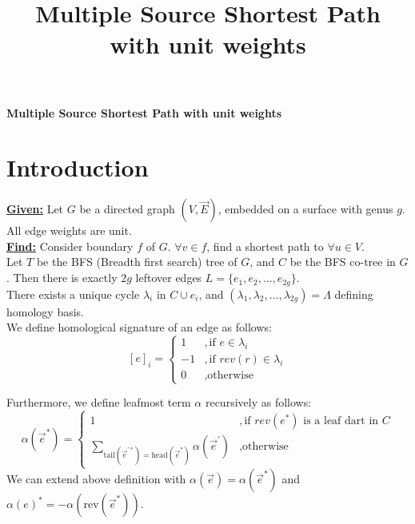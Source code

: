\documentclass{article}
\begin{document}
\title{Multiple Source Shortest Path with unit weights}

\begin{center}
\textbf{\large Multiple Source Shortest Path with unit weights}
\end{center}

\section{Introduction}

\textbf{\underline{Given:}} Let $G$ be a directed graph $(V, \vec{E})$, embedded
on a surface with genus $g$. All edge weights are unit. \\
\textbf{\underline{Find:}} Consider boundary $f$ of $G$. $\forall v \in f$, find
a shortest path to $\forall u \in V$. \\

Let $T$ be the BFS (Breadth first search) tree of $G$, and $C$ be the BFS co-tree
in $G$. Then there is exactly $2g$ leftover edges $L = \{e_1, e_2, \ldots, e_{2g}\}$. \\

There exists a unique cycle $\lambda_i$ in $C \cup {e_i}$, and $(\lambda_1, 
\lambda_2, \ldots, \lambda_{2g}) = \Lambda$ defining homology basis. \\
We define homological signature of an edge as follows:
\[ [e]_{i} = \begin{cases} 1 & ,\mbox{if } e \in \lambda_i \\
                          -1 & ,\mbox{if } rev(r) \in \lambda_i \\
                           0 & ,\mbox{otherwise} \end{cases}\]

Furthermore, we define leafmost term $\alpha$ recursively as follows: \\
\[ \alpha(\vec{e}^*) = \begin{cases} 1 & ,\mbox{if } rev(e^*) \mbox{ is a leaf dart in } C \\
                           \sum \limits_{ \text{tail}(\vec{e}^{'*})
                           = \text{head}(\vec{e}^*) } \alpha(\vec{e}^{'}) & ,
                           \mbox{otherwise} \end{cases}\]
We can extend above definition with $\alpha(\vec{e}) = \alpha( \vec{e}^* )$ and 
  $\alpha(e)^* = - \alpha(\text{rev}(\vec{e}^*))$. \\
\end{document}
